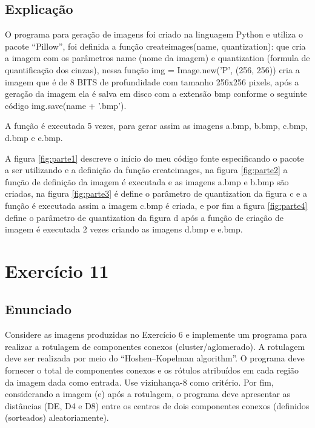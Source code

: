 \documentclass{article}
\begin{document}
\subsection{Explicação}

O programa para geração de imagens foi criado na linguagem Python e utiliza o pacote “Pillow”, foi definida a função {\ttfamily create\textunderscore images(name, quantization):}    que cria a imagem com os parâmetros name (nome da imagem) e quantization (formula de quantificação dos cinzas), nessa função {\ttfamily img = Image.new('P', (256, 256))}   cria a imagem que é de 8 BITS de profundidade com tamanho 256x256 pixels, após a geração da imagem ela é salva em disco com a extensão bmp conforme o seguinte código  {\ttfamily img.save(name + '.bmp')}.

A função é executada 5 vezes, para gerar assim as imagens a.bmp, b.bmp, c.bmp, d.bmp e e.bmp.  

A figura \ref{fig:parte1} descreve o início do meu código fonte especificando o pacote a ser utilizando e a definição da função  create\textunderscore images, na figura \ref{fig:parte2} a função de definição da imagem é executada e as imagens a.bmp e b.bmp são criadas, na figura \ref{fig:parte3} é define o parâmetro de quantization da figura c e a função é executada assim a imagem c.bmp é criada, e por fim a figura \ref{fig:parte4}  define o parâmetro de quantization da figura d após a função de criação de imagem é executada 2 vezes criando as imagens d.bmp e e.bmp.

\section{Exercício 11}

\subsection{Enunciado}

Considere as imagens produzidas no Exercício 6 e implemente um programa para realizar a rotulagem de componentes conexos (cluster/aglomerado). A rotulagem deve ser realizada por meio do “Hoshen–Kopelman algorithm”. O programa deve fornecer o total de componentes conexos e os rótulos atribuídos em cada região da imagem dada como entrada. Use vizinhança-8 como critério. Por fim, considerando a imagem (e) após a rotulagem, o programa deve apresentar as distâncias (DE, D4 e D8) entre os centros de dois componentes conexos (definidos (sorteados) aleatoriamente).
\end{document}
